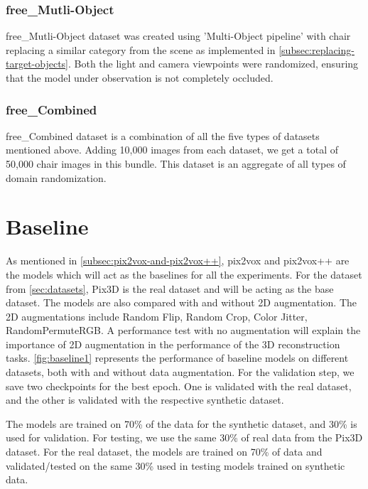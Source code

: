 \subsubsection{\gls{free}\_Mutli-Object}

    \gls{free}\_Mutli-Object dataset was created using 'Multi-Object pipeline' with chair replacing a similar category from the scene as implemented in \autoref{subsec:replacing-target-objects}.
    Both the light and camera viewpoints were randomized, ensuring that the model under observation is not completely occluded.

\subsubsection{\gls{free}\_Combined}
    \gls{free}\_Combined dataset is a combination of all the five types of datasets mentioned above.
    Adding 10,000 images from each dataset, we get a total of 50,000 chair images in this bundle.
    This dataset is an aggregate of all types of domain randomization.

\section{Baseline}\label{sec:baseline}

As mentioned in \autoref{subsec:pix2vox-and-pix2vox++}, pix2vox and pix2vox++ are the models which will act as the baselines for all the experiments.
For the dataset from \autoref{sec:datasets}, Pix3D is the real dataset and will be acting as the base dataset.
The models are also compared with and without 2D augmentation.
The 2D augmentations include Random Flip, Random Crop, Color Jitter, RandomPermuteRGB\@.
A performance test with no augmentation will explain the importance of 2D augmentation in the performance of the 3D reconstruction tasks.
\autoref{fig:baseline1} represents the performance of baseline models on different datasets, both with and without data augmentation.
For the validation step, we save two checkpoints for the best epoch.
One is validated with the real dataset, and the other is validated with the respective synthetic dataset.

The models are trained on 70\% of the data for the synthetic dataset, and 30\% is used for validation.
For testing, we use the same 30\% of real data from the Pix3D dataset.
For the real dataset, the models are trained on 70\% of data and validated/tested on the same 30\% used in testing models trained on synthetic data.


